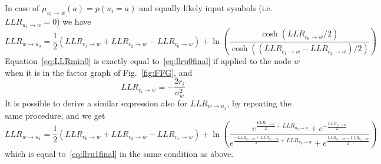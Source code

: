 \documentclass[10pt]{article}
\begin{document}
In case of $\mu_{u_i \rightarrow w}(a) = p(u_i = a)$ and equally likely input symbols (i.e. $LLR_{u_1 \rightarrow w} = 0$) we have
\begin{equation}
	LLR_{w\rightarrow u_0} = \frac{1}{2}(LLR_{c_1 \rightarrow w} + LLR_{c_2 \rightarrow w} - LLR_{c_0 \rightarrow w}) + \ln \left(
						\frac{\cosh(LLR_{c_0 \rightarrow w}/2)}
						{\cosh((LLR_{c_1 \rightarrow w}-LLR_{c_2 \rightarrow w})/2)}								
							\right)
\end{equation}
Equation~\eqref{eq:LLRmin0} is exactly equal to~\eqref{eq:llru0final} if applied to the node $w$ when it is in the factor graph of Fig.~\ref{fig:FFG}, and
\begin{equation}\label{eq:LLR_leaf}
	LLR_{c_i \rightarrow w} = -\frac{2r_i}{\sigma_w^2}
\end{equation}
It is possible to derive a similar expression also for $LLR_{w\rightarrow u_1}$, by repeating the same procedure, and we get 
\begin{equation}
	LLR_{w\rightarrow u_1} = 
						\frac{1}{2}(LLR_{c_0 \rightarrow w} + LLR_{c_2 \rightarrow w} - LLR_{c_1 \rightarrow w}) + \ln \left(
						\frac{e^{\frac{LLR_{c_1 \rightarrow w}}{2} + LLR_{u_0 \rightarrow w}} + e^{-\frac{LLR_{c_1 \rightarrow w}}{2}}}
						{e^{\frac{-LLR_{c_0 \rightarrow w}+ LLR_{c_2 \rightarrow w}}{2}+LLR_{u_0 \rightarrow w}} + e^{\frac{LLR_{c_0 \rightarrow w}- LLR_{c_2 \rightarrow w}}{2}}}								
							\right)
\end{equation}
which is equal to~\eqref{eq:llru1final} in the same condition as above.
\end{document}

